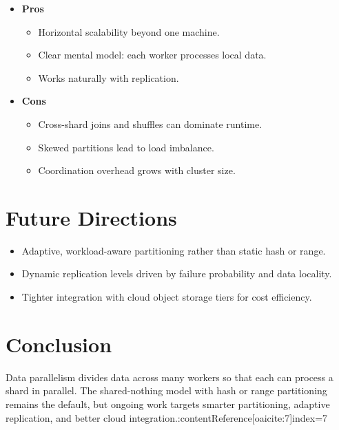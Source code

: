 \documentclass[11pt]{article}
\begin{document}
\begin{itemize}[itemsep=0pt]
  \item \textbf{Pros}
    \begin{itemize}[itemsep=0pt]
      \item Horizontal scalability beyond one machine.
      \item Clear mental model: each worker processes local data.
      \item Works naturally with replication.
    \end{itemize}
  \item \textbf{Cons}
    \begin{itemize}[itemsep=0pt]
      \item Cross-shard joins and shuffles can dominate runtime.
      \item Skewed partitions lead to load imbalance.
      \item Coordination overhead grows with cluster size.
    \end{itemize}
\end{itemize}

\section{Future Directions}

\begin{itemize}[itemsep=0pt]
  \item Adaptive, workload-aware partitioning rather than static hash or range.
  \item Dynamic replication levels driven by failure probability and data locality.
  \item Tighter integration with cloud object storage tiers for cost efficiency.
\end{itemize}

\section*{Conclusion}

Data parallelism divides data across many workers so that each can process a shard in parallel.  The shared-nothing model with hash or range partitioning remains the default, but ongoing work targets smarter partitioning, adaptive replication, and better cloud integration.:contentReference[oaicite:7]{index=7}
\end{document}
